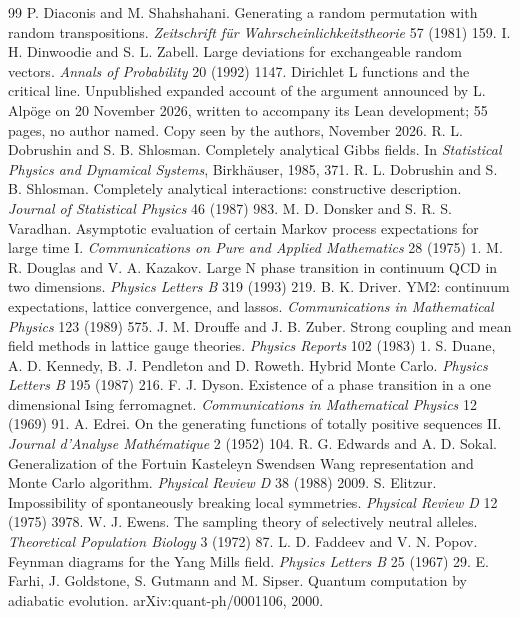 \begin{thebibliography}{99}
 P. Diaconis and M. Shahshahani. Generating a random permutation with random transpositions. \emph{Zeitschrift f\"ur Wahrscheinlichkeitstheorie} 57 (1981) 159.
 I. H. Dinwoodie and S. L. Zabell. Large deviations for exchangeable random vectors. \emph{Annals of Probability} 20 (1992) 1147.
 Dirichlet L functions and the critical line. Unpublished expanded account of the argument announced by L. Alp\"oge on 20 November 2026, written to accompany its Lean development; 55 pages, no author named. Copy seen by the authors, November 2026.
 R. L. Dobrushin and S. B. Shlosman. Completely analytical Gibbs fields. In \emph{Statistical Physics and Dynamical Systems}, Birkh\"auser, 1985, 371.
 R. L. Dobrushin and S. B. Shlosman. Completely analytical interactions: constructive description. \emph{Journal of Statistical Physics} 46 (1987) 983.
 M. D. Donsker and S. R. S. Varadhan. Asymptotic evaluation of certain Markov process expectations for large time I. \emph{Communications on Pure and Applied Mathematics} 28 (1975) 1.
 M. R. Douglas and V. A. Kazakov. Large N phase transition in continuum QCD in two dimensions. \emph{Physics Letters B} 319 (1993) 219.
 B. K. Driver. YM2: continuum expectations, lattice convergence, and lassos. \emph{Communications in Mathematical Physics} 123 (1989) 575.
 J. M. Drouffe and J. B. Zuber. Strong coupling and mean field methods in lattice gauge theories. \emph{Physics Reports} 102 (1983) 1.
 S. Duane, A. D. Kennedy, B. J. Pendleton and D. Roweth. Hybrid Monte Carlo. \emph{Physics Letters B} 195 (1987) 216.
 F. J. Dyson. Existence of a phase transition in a one dimensional Ising ferromagnet. \emph{Communications in Mathematical Physics} 12 (1969) 91.
 A. Edrei. On the generating functions of totally positive sequences II. \emph{Journal d'Analyse Math\'ematique} 2 (1952) 104.
 R. G. Edwards and A. D. Sokal. Generalization of the Fortuin Kasteleyn Swendsen Wang representation and Monte Carlo algorithm. \emph{Physical Review D} 38 (1988) 2009.
 S. Elitzur. Impossibility of spontaneously breaking local symmetries. \emph{Physical Review D} 12 (1975) 3978.
 W. J. Ewens. The sampling theory of selectively neutral alleles. \emph{Theoretical Population Biology} 3 (1972) 87.
 L. D. Faddeev and V. N. Popov. Feynman diagrams for the Yang Mills field. \emph{Physics Letters B} 25 (1967) 29.
 E. Farhi, J. Goldstone, S. Gutmann and M. Sipser. Quantum computation by adiabatic evolution. arXiv:quant-ph/0001106, 2000.

\end{thebibliography}
